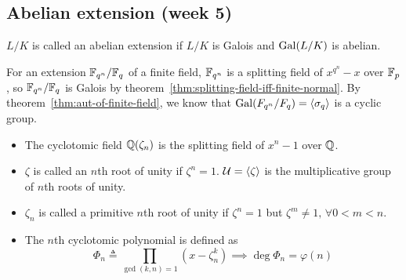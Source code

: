 \subsection{Abelian extension (week 5)}

\begin{definition}
  $L/K$ is called an abelian extension if $L/K$ is Galois and $\operatorname{Gal}(L/K)$ is abelian.
\end{definition}

\begin{example}
  For an extension $\mathbb{F}_{q^n} / \mathbb{F}_q$ of a finite field, $\mathbb{F}_{q^n}$ is a splitting field of $x^{q^n}-x$
  over $\mathbb{F}_p$, so $\mathbb{F}_{q^n} / \mathbb{F}_q$ is Galois by theorem~\ref{thm:splitting-field-iff-finite-normal}.
  By theorem~\ref{thm:aut-of-finite-field}, we know that $\operatorname{Gal}(F_{q^n} / F_q) = \langle\sigma_q\rangle$
  is a cyclic group.
\end{example}

\begin{definition} \hfill
  \begin{itemize}
    \item The cyclotomic field $\mathbb{Q}(\zeta_n)$ is the splitting field of $x^n - 1$ over $\mathbb{Q}$.
    \item $\zeta$ is called an $n$th root of unity if $\zeta^n = 1$. $\mathcal{U} = \langle\zeta\rangle$
      is the multiplicative group of $n$th roots of unity.
    \item $\zeta_n$ is called a primitive $n$th root of unity if $\zeta^n = 1$ but
      $\zeta^m \ne 1, \, \forall 0 < m < n$.
    \item The $n$th cyclotomic polynomial is defined as
      \[ \Phi_n \triangleq \prod_{\gcd(k, n) = 1} (x - \zeta_n^k) \implies \deg \Phi_n = \varphi(n) \]
  \end{itemize}
\end{definition}


